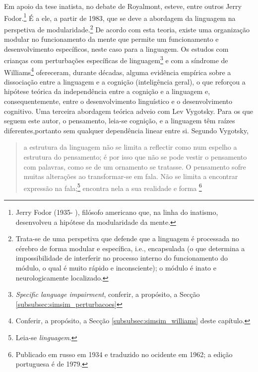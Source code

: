 \documentclass[output=paper]{LSP/langsci}
\begin{document}
Em apoio da tese inatista, no debate de Royalmont, esteve, entre outros Jerry Fodor.\footnote{Jerry Fodor (1935- ), filósofo americano que, na linha do inatismo, desenvolveu a hipótese da modularidade da mente.} É a ele, a partir de 1983, que se deve a abordagem da linguagem na perspetiva de modularidade.\footnote{Trata-se de uma perspetiva que defende que a linguagem é processada no cérebro de forma modular e específica, i.e., encapsulada (o que determina a impossibilidade de interferir no processo interno do funcionamento do módulo, o qual é muito rápido e inconsciente); o módulo é inato e neurologicamente localizado.\label{ftn:simsim_rodape_27}} De acordo com esta teoria, existe uma organização modular no funcionamento da mente que permite um funcionamento e desenvolvimento específicos, neste caso para a linguagem. Os estudos com crianças com perturbações específicas de linguagem\footnote{\emph{Specific language impairment}, conferir, a propósito, a Secção \ref{subsubsec:simsim_perturbacoes}} e com a síndrome de Williams\footnote{Conferir, a propósito, a Secção \ref{subsubsec:simsim_williams} deste capítulo.} ofereceram, durante décadas, alguma evidência empírica sobre a dissociação entre a linguagem e a cognição (inteligência geral), o que reforçou a hipótese teórica da independência entre a cognição e a linguagem e, consequentemente, entre o desenvolvimento linguístico e o desenvolvimento cognitivo. Uma terceira abordagem teórica adveio com Lev Vygotsky. Para os que seguem este autor, o pensamento, leia-se cognição, e a linguagem têm raízes diferentes,\largerpage portanto sem qualquer dependência linear entre si. Segundo Vygotsky, 

\begin{quote}
a estrutura da linguagem não se limita a reflectir como num espelho a estrutura do pensamento; é por isso que não se pode vestir o pensamento com palavras, como se de um ornamento se tratasse. O pensamento sofre muitas alterações ao transformar-se em fala. Não se limita a encontrar expressão na fala;\footnote{Leia-se \emph{linguagem}.} encontra nela a sua realidade e forma \citep[166]{vygotsky1979}\footnote{Publicado em russo em 1934 e traduzido no ocidente em 1962; a edição portuguesa é de 1979.}
\end{quote}
\end{document}
